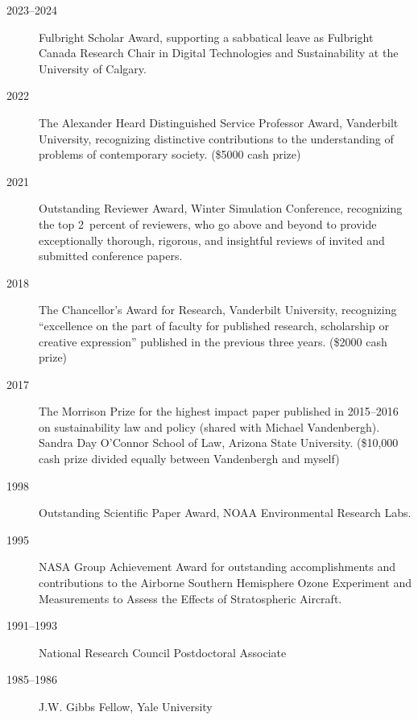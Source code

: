 \begin{description}
\item[2023--2024] Fulbright Scholar Award, supporting a sabbatical leave as
  Fulbright Canada Research Chair in Digital Technologies and Sustainability 
  at the University of Calgary.
\item[2022] The Alexander Heard Distinguished Service Professor Award,
  Vanderbilt University, recognizing distinctive contributions to the
  understanding of problems of contemporary society.
  (\$5000 cash prize)
\item[2021] Outstanding Reviewer Award, Winter Simulation Conference,
  recognizing the top 2~percent of reviewers, who go above and beyond to provide
  exceptionally thorough, rigorous, and insightful reviews of invited and
  submitted conference papers.
\item[2018] The Chancellor's Award for Research, Vanderbilt University,
  recognizing ``excellence on the part of faculty for
  published research, scholarship or creative expression'' published in the
  previous three years.
  (\$2000 cash prize)
\item[2017] The Morrison Prize for the highest impact paper published in
  2015--2016 on sustainability law and policy (shared with Michael Vandenbergh).
  Sandra Day O'Connor School of Law, Arizona State University.
  (\$10,000 cash prize divided equally between Vandenbergh and myself)
\item[1998] Outstanding Scientific Paper Award, NOAA Environmental Research
  Labs.
\item[1995] NASA Group Achievement Award for outstanding accomplishments and
  contributions to the Airborne Southern Hemisphere Ozone Experiment and
  Measurements to Assess the Effects of Stratospheric Aircraft.
\item[1991--1993] National Research Council Postdoctoral Associate
\item[1985--1986] J.W. Gibbs Fellow, Yale University
\end{description}
